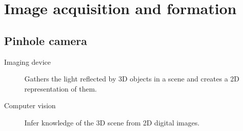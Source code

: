 \chapter{Image acquisition and formation}


\section{Pinhole camera}

\begin{description}
    \item[Imaging device] 
        Gathers the light reflected by 3D objects in a scene and creates a 2D representation of them.

    \item[Computer vision] 
        Infer knowledge of the 3D scene from 2D digital images.
\end{description}

